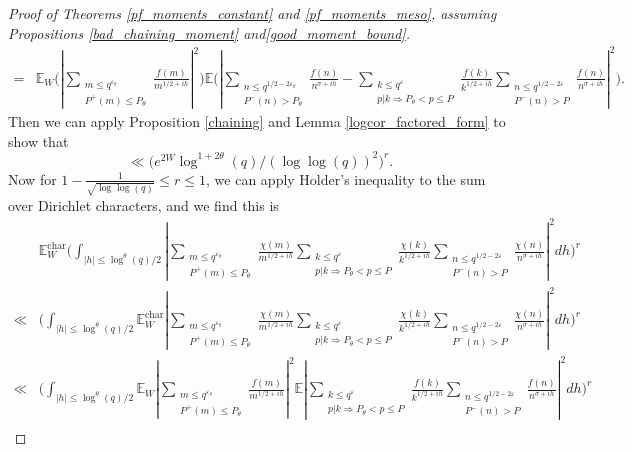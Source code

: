 \documentclass[reqno]{amsart}
\theoremstyle{definition}
\theoremstyle{remark}
\numberwithin{equation}{section}
\theoremstyle{remark}
\begin{document}
\begin{proof}[Proof of Theorems \ref{pf_moments_constant} and \ref{pf_moments_meso}, assuming Propositions \ref{bad_chaining_moment} and\ref{good_moment_bound}]
\begin{equation*}
\begin{split}
        =& \mathbb{E}_W\big(|\sum_{\substack{m \leq q^{\varepsilon_\theta} \\ P^+(m) \leq P_\theta}}\frac{f(m)}{m^{1/2+ih}}|^2\big)\mathbb{E}\big(|\sum_{\substack{n \leq q^{1/2-2\varepsilon_\theta} \\ P^{-}(n) >P_\theta}}\frac{f(n)}{n^{\sigma+ih}}-\sum_{\substack{k \leq q^{\varepsilon} \\ p|k \Rightarrow P_\theta < p \leq P}}\frac{f(k)}{k^{1/2+ih}}\sum_{\substack{n \leq q^{1/2-2\varepsilon} \\ P^{-}(n) > P}}\frac{f(n)}{n^{\sigma+ih}}|^2\big).
    \end{split}     
    \end{equation*}
    Then we can apply Proposition \ref{chaining} and Lemma \ref{logcor_factored_form} to show that
    $$\ll \big(e^{2W}\log^{1+2\theta}(q)/(\log\log(q))^2\big)^r.$$
    Now for $1-\frac{1}{\sqrt{\log\log(q)}} \leq r \leq 1$, we can apply Holder's inequality to the sum over Dirichlet characters, and we find this is
    \begin{align*}
        &\mathbb{E}_W^{\text{char}}\big(\int_{|h| \leq \log^\theta(q)/2}|\sum_{\substack{m \leq q^{\varepsilon_\theta} \\ P^+(m) \leq P_\theta}}\frac{\chi(m)}{m^{1/2+ih}}\sum_{\substack{k \leq q^{\varepsilon} \\ p|k \Rightarrow P_\theta < p \leq P}}\frac{\chi(k)}{k^{1/2+ih}}\sum_{\substack{n \leq q^{1/2-2\varepsilon} \\ P^{-}(n) > P}}\frac{\chi(n)}{n^{\sigma+ih}}|^2dh\big)^r \\
        \ll&\big(\int_{|h| \leq \log^\theta(q)/2}\mathbb{E}_W^{\text{char}}|\sum_{\substack{m \leq q^{\varepsilon_\theta} \\ P^+(m) \leq P_\theta}}\frac{\chi(m)}{m^{1/2+ih}}\sum_{\substack{k \leq q^{\varepsilon} \\ p|k \Rightarrow P_\theta < p \leq P}}\frac{\chi(k)}{k^{1/2+ih}}\sum_{\substack{n \leq q^{1/2-2\varepsilon} \\ P^{-}(n) > P}}\frac{\chi(n)}{n^{\sigma+ih}}|^2dh\big)^r \\
        \ll& \big(\int_{|h| \leq \log^\theta(q)/2}\mathbb{E}_W|\sum_{\substack{m \leq q^{\varepsilon_\theta} \\ P^+(m) \leq P_\theta}}\frac{f(m)}{m^{1/2+ih}}|^2\mathbb{E}|\sum_{\substack{k \leq q^{\varepsilon} \\ p|k \Rightarrow P_\theta < p \leq P}}\frac{f(k)}{k^{1/2+ih}}\sum_{\substack{n \leq q^{1/2-2\varepsilon} \\ P^{-}(n) > P}}\frac{f(n)}{n^{\sigma+ih}}|^2dh\big)^r \\

\end{align*}
\end{proof}
\end{document}

